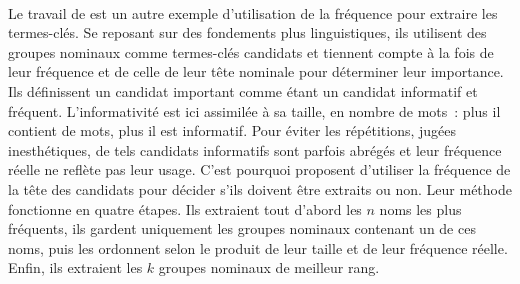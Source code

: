         ~\\Le travail de  est un autre exemple
        d'utilisation de la fréquence pour extraire les termes-clés. Se reposant
        sur des fondements plus linguistiques, ils utilisent des groupes
        nominaux comme termes-clés candidats et tiennent compte à la fois de
        leur fréquence et de celle de leur tête nominale pour déterminer leur
        importance. Ils définissent un candidat important comme étant un
        candidat informatif et fréquent. L'informativité est ici assimilée à sa
        taille, en nombre de mots~: plus il contient de mots, plus il est
        informatif. Pour éviter les répétitions, jugées inesthétiques, de tels
        candidats informatifs sont parfois abrégés et leur fréquence réelle ne
        reflète pas leur usage. C'est pourquoi
         proposent d'utiliser la fréquence de
        la tête des candidats pour décider s'ils doivent être extraits ou non.
        Leur méthode fonctionne en quatre étapes. Ils extraient tout d'abord les
        $n$ noms les plus fréquents, ils gardent uniquement les groupes nominaux
        contenant un de ces noms, puis les ordonnent selon le produit de leur
        taille et de leur fréquence réelle. Enfin, ils extraient les $k$ groupes
        nominaux de meilleur rang.

